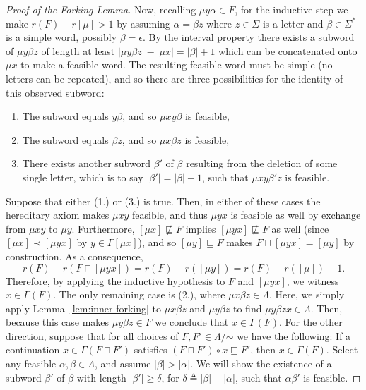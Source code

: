 \documentclass[10pt,a4paper]{amsart}
\newcommand{\glang}{\Lambda}
\newcommand{\univ}{\Sigma}
\begin{document}
\begin{proof}[Proof of the Forking Lemma]
    Now, recalling $\mu y \alpha \in F$, for the inductive step we make $r(F) - r[\mu] > 1$ by assuming $\alpha = \beta z$ where $z \in \univ$ is a letter and $\beta \in \univ^*$ is a simple word, possibly $\beta = \epsilon$.
    By the interval property there exists a subword of $\mu y \beta z$ of length at least $|\mu y \beta z| - |\mu x| = |\beta| + 1$ which can be concatenated onto $\mu x$ to make a feasible word.
    The resulting feasible word must be simple (no letters can be repeated), and so there are three possibilities for the identity of this observed subword:
    \begin{enumerate}
        \item The subword equals $y\beta$, and so $\mu x y \beta$ is feasible,
        \item The subword equals $\beta z$, and so $\mu x \beta z$ is feasible,
        \item There exists another subword $\beta'$ of $\beta$ resulting from the deletion of some single letter, which is to say $|\beta'| = |\beta| -1$, such that $\mu x y \beta' z$ is feasible.
    \end{enumerate}
    Suppose that either (1.) or (3.) is true.
    Then, in either of these cases the hereditary axiom makes $\mu xy$ feasible, and thus $\mu y x$ is feasible as well by exchange from $\mu xy$ to $\mu y$.
    Furthermore, $[\mu x] \not\sqsubseteq F$ implies $[\mu y x] \not\sqsubseteq F$ as well (since $[\mu x] \prec [\mu y x]$ by $y \in \Gamma[\mu x]$), and so $[\mu y] \sqsubseteq F$ makes $F \sqcap [\mu yx] = [\mu y]$ by construction.
    As a consequence,
    \[
        r(F) - r(F \sqcap [\mu y x]) = r(F) - r([\mu y]) = r(F) - r([\mu]) + 1.
    \]
    Therefore, by applying the inductive hypothesis to $F$ and $[\mu y x]$, we witness $x \in \Gamma(F)$.
    The only remaining case is (2.), where $\mu x \beta z \in \glang$.
    Here, we simply apply Lemma~\ref{lem:inner-forking} to $\mu x \beta z$ and $\mu y \beta z$ to find $\mu y \beta z x \in \glang$.
    Then, because this case makes $\mu y \beta z \in F$ we conclude that $x \in \Gamma(F)$.
\iffalse
    For the other direction, suppose that for all choices of $F,F' \in \glang/\mathord{\sim}$ we have the following: If a continuation $x \in \Gamma(F\sqcap F')$ satisfies $(F\sqcap F')\circ x \sqsubseteq F'$, then $x \in \Gamma(F)$.
    Select any feasible $\alpha, \beta \in \glang$, and assume $|\beta| > |\alpha|$.
    We will show the existence of a subword $\beta'$ of $\beta$ with length $|\beta'| \geq \delta$, for $\delta \triangleq |\beta| - |\alpha|$, such that $\alpha\beta'$ is feasible.

\end{proof}
\end{document}
